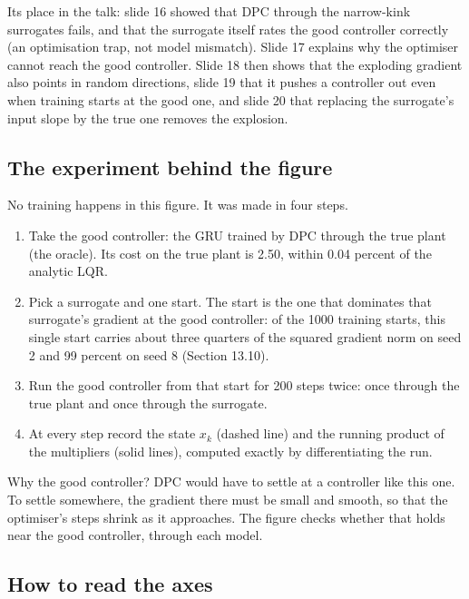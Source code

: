 \documentclass[11pt]{article}
\begin{document}
Its place in the talk: slide 16 showed that DPC through the narrow-kink surrogates fails, and that the surrogate itself rates the good controller correctly (an optimisation trap, not model mismatch). Slide 17 explains why the optimiser cannot reach the good controller. Slide 18 then shows that the exploding gradient also points in random directions, slide 19 that it pushes a controller out even when training starts at the good one, and slide 20 that replacing the surrogate's input slope by the true one removes the explosion.

\subsection{The experiment behind the figure}

No training happens in this figure. It was made in four steps.
\begin{enumerate}
\item Take the good controller: the GRU trained by DPC through the true plant (the oracle). Its cost on the true plant is 2.50, within 0.04 percent of the analytic LQR.
\item Pick a surrogate and one start. The start is the one that dominates that surrogate's gradient at the good controller: of the 1000 training starts, this single start carries about three quarters of the squared gradient norm on seed 2 and 99 percent on seed 8 (Section 13.10).
\item Run the good controller from that start for 200 steps twice: once through the true plant and once through the surrogate.
\item At every step record the state $x_k$ (dashed line) and the running product of the multipliers (solid lines), computed exactly by differentiating the run.
\end{enumerate}

Why the good controller? DPC would have to settle at a controller like this one. To settle somewhere, the gradient there must be small and smooth, so that the optimiser's steps shrink as it approaches. The figure checks whether that holds near the good controller, through each model.

\subsection{How to read the axes}
\end{document}
